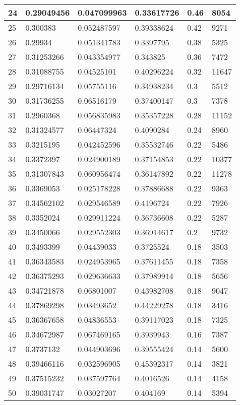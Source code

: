 \begin{longtable}{|l|l|l|l|l|l|}
24 & 0.29049456 & 0.047099963 & 0.33617726 & 0.46 & 8054 \\ \hline 
25 & 0.300383 & 0.052487597 & 0.39338624 & 0.42 & 9271 \\ \hline 
26 & 0.29934 & 0.051341783 & 0.3397795 & 0.38 & 5325 \\ \hline 
27 & 0.31253266 & 0.043354977 & 0.343825 & 0.36 & 7472 \\ \hline 
28 & 0.31088755 & 0.04525101 & 0.40296224 & 0.32 & 11647 \\ \hline 
29 & 0.29716134 & 0.05755116 & 0.34938234 & 0.3 & 5512 \\ \hline 
30 & 0.31736255 & 0.06516179 & 0.37400147 & 0.3 & 7378 \\ \hline 
31 & 0.2960368 & 0.056835983 & 0.35357228 & 0.28 & 11152 \\ \hline 
32 & 0.31324577 & 0.06447324 & 0.4090284 & 0.24 & 8960 \\ \hline 
33 & 0.3215195 & 0.042452596 & 0.35532746 & 0.22 & 5486 \\ \hline 
34 & 0.3372397 & 0.024900189 & 0.37154853 & 0.22 & 10377 \\ \hline 
35 & 0.31307843 & 0.060956474 & 0.36147892 & 0.22 & 11278 \\ \hline 
36 & 0.3369053 & 0.025178228 & 0.37886688 & 0.22 & 9363 \\ \hline 
37 & 0.34562102 & 0.029546589 & 0.4196724 & 0.22 & 7926 \\ \hline 
38 & 0.3352024 & 0.029911224 & 0.36736608 & 0.22 & 5287 \\ \hline 
39 & 0.3450066 & 0.029552303 & 0.36914617 & 0.2 & 9732 \\ \hline 
40 & 0.3493399 & 0.04439033 & 0.3725524 & 0.18 & 3503 \\ \hline 
41 & 0.36343583 & 0.024953965 & 0.37611455 & 0.18 & 7358 \\ \hline 
42 & 0.36375293 & 0.029636633 & 0.37989914 & 0.18 & 5656 \\ \hline 
43 & 0.34721878 & 0.06801007 & 0.43982708 & 0.18 & 9047 \\ \hline 
44 & 0.37869298 & 0.03493652 & 0.44229278 & 0.18 & 3416 \\ \hline 
45 & 0.36367658 & 0.04836553 & 0.39117023 & 0.18 & 7325 \\ \hline 
46 & 0.34672987 & 0.067469165 & 0.3939943 & 0.16 & 7387 \\ \hline 
47 & 0.3737132 & 0.044903696 & 0.39555424 & 0.14 & 5600 \\ \hline 
48 & 0.39466116 & 0.032596905 & 0.45392317 & 0.14 & 3821 \\ \hline 
49 & 0.37515232 & 0.037597764 & 0.4016526 & 0.14 & 4158 \\ \hline 
50 & 0.39031747 & 0.03027207 & 0.404169 & 0.14 & 5394 \\ \hline 
\end{longtable}